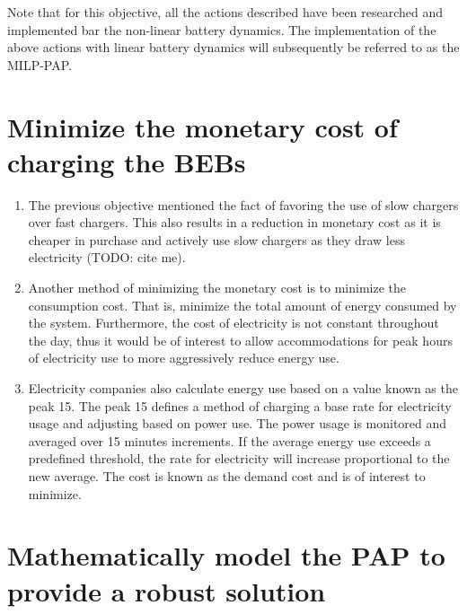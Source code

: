 \documentclass[ee,msthesis]{usuthesis}
\begin{document}
Note that for this objective, all the actions described have been researched and implemented bar the non-linear
battery dynamics. The implementation of the above actions with linear battery dynamics will subsequently be referred to
as the MILP-PAP.

\section{Minimize the monetary cost of charging the BEBs}
\label{sec:orgfc137b8}

\begin{enumerate}
\item The previous objective mentioned the fact of favoring the use of slow chargers over fast chargers. This also results
in a reduction in monetary cost as it is cheaper in purchase and actively use slow chargers as they draw less
electricity (TODO: cite me).

\item Another method of minimizing the monetary cost is to minimize the consumption cost. That is, minimize the total
amount of energy consumed by the system. Furthermore, the cost of electricity is not constant throughout the day,
thus it would be of interest to allow accommodations for peak hours of electricity use to more aggressively reduce
energy use.

\item Electricity companies also calculate energy use based on a value known as the peak 15. The peak 15 defines a method
of charging a base rate for electricity usage and adjusting based on power use. The power usage is monitored and averaged
over 15 minutes increments. If the average energy use exceeds a predefined threshold, the rate for electricity will
increase proportional to the new average. The cost is known as the demand cost and is of interest to minimize.
\end{enumerate}

\section{Mathematically model the PAP to provide a robust solution}
\label{sec:org523c026}
\end{document}
